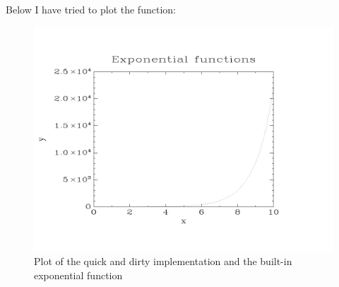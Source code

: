 \documentclass{article}
\begin{document}
Below I have tried to plot the function:
\begin{figure}
	\includegraphics[scale = 0.5]{graph.png}
	\caption{Plot of the quick and dirty implementation and the built-in exponential function}
\end{figure}
\end{document}
